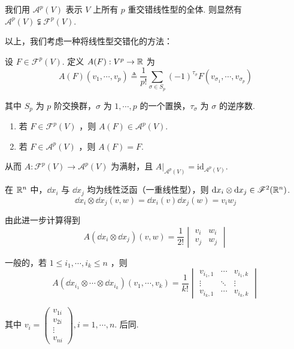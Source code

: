 我们用 $\mathscr{A}^p(V)$ 表示 $V$ 上所有 $p$ 重交错线性型的全体. 则显然有 $\mathscr{A}^p(V)\subsetneqq\mathscr{F}^p(V)$.

以上，我们考虑一种将线性型交错化的方法：

\begin{definition}
   设 $F\in\mathscr{F}^p(V)$. 定义 $A(F):V^p\to\mathbb{R}$ 为
$$
A(F)(v_1,\cdots,v_p)\triangleq\frac{1}{p!}\sum_{\sigma\in S_p}(-1)^{\tau_\sigma}F(v_{\sigma_1},\cdots,v_{\sigma_p})
$$

    其中 $S_p$ 为 $p$ 阶交换群，$\sigma$ 为 $1,\cdots,p$ 的一个置换，$\tau_\sigma$ 为 $\sigma$ 的逆序数.
\end{definition}

\begin{property}
    \begin{enumerate}
        \item 若 $F\in\mathscr{F}^p(V)$ ，则 $A(F)\in\mathscr{A}^p(V)$.
        
        \item 若 $F\in\mathscr{A}^p(V)$ ，则 $A(F)=F$.
    \end{enumerate}
\end{property}

从而 $A:\mathscr{F}^p(V)\to\mathscr{A}^p(V)$ 为满射，且 $A|_{\mathscr{A}^p(V)}=\mathrm{id}_{\mathscr{A}^p(V)}$.

\begin{example}
    在 $\mathbb{R}^n$ 中，$\dd x_i$ 与 $\dd x_j$ 均为线性泛函（一重线性型），则 $\mathrm{d} x_i\otimes\mathrm{d} x_j\in\mathscr{F}^2(\mathbb{R}^n)$.
$$
\dd x_i\otimes\dd x_j(v,w)=\dd x_i(v)\dd x_j(w)=v_iw_j
$$

    由此进一步计算得到
$$
A(\dd x_i\otimes\dd x_j)(v,w)=\frac{1}{2!}\begin{vmatrix}
    v_i & w_i\\
    v_j & w_j
\end{vmatrix}
$$

    一般的，若 $1\le i_1,\cdots,i_k\le n$ ，则
$$
A(\dd x_{i_1}\otimes\cdots\otimes\dd x_{i_k})(v_1,\cdots,v_k)=\frac{1}{k!}\begin{vmatrix}
    v_{i_1,1} & \cdots & v_{i_1,k}\\
    \vdots & \ddots & \vdots\\
    v_{i_k,1} & \cdots & v_{i_k,k}
\end{vmatrix}
$$

    其中 $v_i=\begin{pmatrix}v_{1i}\\v_{2i}\\\vdots\\v_{ni}\end{pmatrix},i=1,\cdots,n$. 后同.
\end{example}

